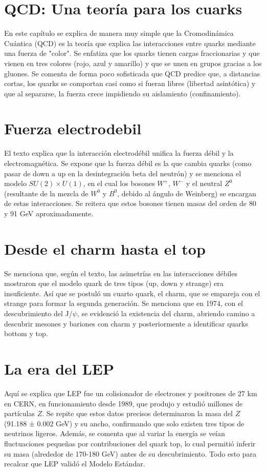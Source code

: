 \documentclass[12pt]{article}
\begin{document}
\section{QCD: Una teoría para los cuarks}
En este capítulo se explica de manera muy simple que la Cromodinámica Cuántica (QCD) es la teoría que explica las interacciones entre quarks mediante una fuerza de "color". Se enfatiza que los quarks tienen cargas fraccionarias y que vienen en tres colores (rojo, azul y amarillo) y que se unen en grupos gracias a los gluones. Se comenta de forma poco sofisticada que QCD predice que, a distancias cortas, los quarks se comportan casi como si fueran libres (libertad asintótica) y que al separarse, la fuerza crece impidiendo su aislamiento (confinamiento).

\section{Fuerza electrodebil}
El texto explica que la interacción electrodébil unifica la fuerza débil y la electromagnética. Se expone que la fuerza débil es la que cambia quarks (como pasar de down a up en la desintegración beta del neutrón) y se menciona el modelo $SU(2)\times U(1)$, en el cual los bosones $W^{+}$, $W^{-}$ y el neutral $Z^{0}$ (resultante de la mezcla de $W^{0}$ y $B^{0}$, debido al ángulo de Weinberg) se encargan de estas interacciones. Se reitera que estos bosones tienen masas del orden de 80 y 91 GeV aproximadamente.

\section{Desde el charm hasta el top}
Se menciona que, según el texto, las asimetrías en las interacciones débiles mostraron que el modelo quark de tres tipos (up, down y strange) era insuficiente. Así que se postuló un cuarto quark, el charm, que se empareja con el strange para formar la segunda generación. Se menciona que en 1974, con el descubrimiento del J/$\psi$, se evidenció la existencia del charm, abriendo camino a descubrir mesones y bariones con charm y posteriormente a identificar quarks bottom y top.

\section{La era del LEP}
Aquí se explica que LEP fue un colisionador de electrones y positrones de 27 km en CERN, en funcionamiento desde 1989, que produjo y estudió millones de partículas $Z$. Se repite que estos datos precisos determinaron la masa del $Z$ (91.188 ± 0.002 GeV) y su ancho, confirmando que solo existen tres tipos de neutrinos ligeros. Además, se comenta que al variar la energía se veían fluctuaciones pequeñas por contribuciones del quark top, lo cual permitió inferir su masa (alrededor de 170-180 GeV) antes de su descubrimiento. Todo esto para recalcar que LEP validó el Modelo Estándar.
\end{document}
